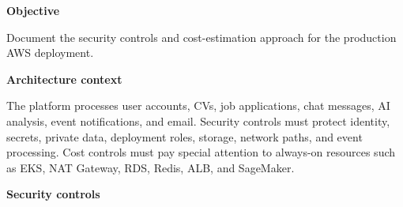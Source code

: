 \vspace{0.5em}\noindent\textbf{Objective}\par

Document the security controls and cost-estimation approach for the
production AWS deployment.

\vspace{0.5em}\noindent\textbf{Architecture context}\par

The platform processes user accounts, CVs, job applications, chat
messages, AI analysis, event notifications, and email. Security controls
must protect identity, secrets, private data, deployment roles, storage,
network paths, and event processing. Cost controls must pay special
attention to always-on resources such as EKS, NAT Gateway, RDS, Redis,
ALB, and SageMaker.

\vspace{0.5em}\noindent\textbf{Security controls}\par

